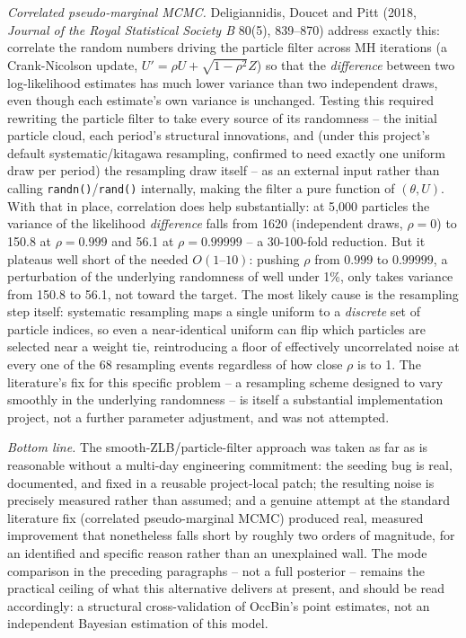 \documentclass[11pt]{article}
\begin{document}
\emph{Correlated pseudo-marginal MCMC.} Deligiannidis, Doucet and Pitt
(2018, \emph{Journal of the Royal Statistical Society B} 80(5), 839--870)
address exactly this: correlate the random numbers driving the particle
filter across MH iterations (a Crank-Nicolson update,
$U'=\rho U+\sqrt{1-\rho^2}Z$) so that the \emph{difference} between two
log-likelihood estimates has much lower variance than two independent
draws, even though each estimate's own variance is unchanged. Testing
this required rewriting the particle filter to take every source of its
randomness -- the initial particle cloud, each period's structural
innovations, and (under this project's default systematic/kitagawa
resampling, confirmed to need exactly one uniform draw per period) the
resampling draw itself -- as an external input rather than calling
\texttt{randn()}/\texttt{rand()} internally, making the filter a pure
function of $(\theta,U)$. With that in place, correlation does help
substantially: at 5{,}000 particles the variance of the likelihood
\emph{difference} falls from 1620 (independent draws, $\rho=0$) to 150.8
at $\rho=0.999$ and 56.1 at $\rho=0.99999$ -- a 30-100-fold reduction. But
it plateaus well short of the needed $O(1\text{--}10)$: pushing $\rho$
from $0.999$ to $0.99999$, a perturbation of the underlying randomness of
well under 1\%, only takes variance from 150.8 to 56.1, not toward the
target. The most likely cause is the resampling step itself: systematic
resampling maps a single uniform to a \emph{discrete} set of particle
indices, so even a near-identical uniform can flip which particles are
selected near a weight tie, reintroducing a floor of effectively
uncorrelated noise at every one of the 68 resampling events regardless of
how close $\rho$ is to 1. The literature's fix for this specific problem
-- a resampling scheme designed to vary smoothly in the underlying
randomness -- is itself a substantial implementation project, not a
further parameter adjustment, and was not attempted.

\emph{Bottom line.} The smooth-ZLB/particle-filter approach was taken as
far as is reasonable without a multi-day engineering commitment: the
seeding bug is real, documented, and fixed in a reusable project-local
patch; the resulting noise is precisely measured rather than assumed; and
a genuine attempt at the standard literature fix (correlated
pseudo-marginal MCMC) produced real, measured improvement that
nonetheless falls short by roughly two orders of magnitude, for an
identified and specific reason rather than an unexplained wall. The mode
comparison in the preceding paragraphs -- not a full posterior -- remains
the practical ceiling of what this alternative delivers at present, and
should be read accordingly: a structural cross-validation of OccBin's
point estimates, not an independent Bayesian estimation of this model.
\end{document}

